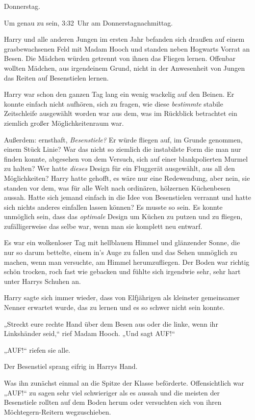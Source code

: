 {Donnerstag.

Um genau zu sein, 3:32~Uhr am Donnerstagnachmittag.

Harry und alle anderen Jungen im ersten Jahr befanden sich draußen auf einem grasbewachsenen Feld mit Madam Hooch und standen neben Hogwarts Vorrat an Besen. Die Mädchen würden getrennt von ihnen das Fliegen lernen. Offenbar wollten Mädchen, aus irgendeinem Grund, nicht in der Anwesenheit von Jungen das Reiten auf Besenstielen lernen.

Harry war schon den ganzen Tag lang ein wenig wackelig auf den Beinen. Er konnte einfach nicht aufhören, sich zu fragen, wie diese \emph{bestimmte} stabile Zeitschleife ausgewählt worden war aus dem, was im Rückblick betrachtet ein ziemlich großer Möglichkeitenraum war.

Außerdem: ernsthaft, \emph{Besenstiele?} Er würde fliegen auf, im Grunde genommen, einem Stück Linie? War das nicht so ziemlich die instabilste Form die man nur finden konnte, abgesehen von dem Versuch, sich auf einer blankpolierten Murmel zu halten? Wer hatte \emph{dieses} Design für ein Fluggerät ausgewählt, aus all den Möglichkeiten? Harry hatte gehofft, es wäre nur eine Redewendung, aber nein, sie standen vor dem, was für alle Welt nach ordinären, hölzernen Küchenbesen aussah. Hatte sich jemand einfach in die Idee von Besenstielen verrannt und hatte sich nichts anderes einfallen lassen können? Es musste so sein. Es konnte unmöglich sein, dass das \emph{optimale} Design um Küchen zu putzen und zu fliegen, zufälligerweise das selbe war, wenn man sie komplett neu entwarf.

Es war ein wolkenloser Tag mit hellblauem Himmel und glänzender Sonne, die nur so darum bettelte, einem in's Auge zu fallen und das Sehen unmöglich zu machen, wenn man versuchte, am Himmel herumzufliegen. Der Boden war richtig schön trocken, roch fast wie gebacken und fühlte sich irgendwie sehr, sehr hart unter Harrys Schuhen an.

Harry sagte sich immer wieder, dass von Elfjährigen als kleinster gemeinsamer Nenner erwartet wurde, das zu lernen und es so schwer nicht sein konnte.

„Streckt eure rechte Hand über dem Besen aus oder die linke, wenn ihr Linkshänder seid,“ rief Madam Hooch. „Und sagt AUF!“

„AUF!“ riefen sie alle.

Der Besenstiel sprang eifrig in Harrys Hand.

Was ihn zunächst einmal an die Spitze der Klasse beförderte. Offensichtlich war „AUF!“ zu sagen sehr viel schwieriger als es aussah und die meisten der Besenstiele rollten auf dem Boden herum oder versuchten sich von ihren Möchtegern-Reitern wegzuschieben.

}
